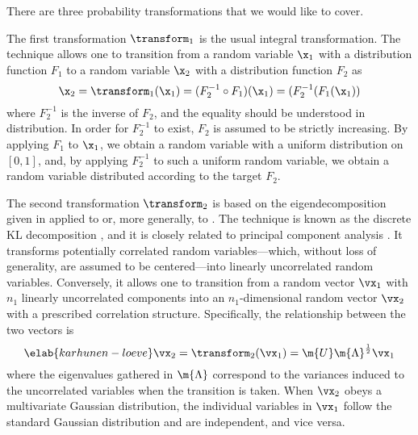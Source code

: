 There are three probability transformations that we would like to cover.

The first transformation $\transform_1$ is the usual integral transformation.
The technique allows one to transition from a random variable $\x_1$ with a
distribution function $F_1$ to a random variable $\x_2$ with a distribution
function $F_2$ as
\[
  \x_2 = \transform_1(\x_1) = (F_2^{-1} \circ F_1)(\x_1) = (F_2^{-1}(F_1(\x_1))
\]
where $F_2^{-1}$ is the inverse of $F_2$, and the equality should be understood
in distribution. In order for $F_2^{-1}$ to exist, $F_2$ is assumed to be
strictly increasing. By applying $F_1$ to $\x_1$, we obtain a random variable
with a uniform distribution on $[0, 1]$, and, by applying $F_2^{-1}$ to such a
uniform random variable, we obtain a random variable distributed according to
the target $F_2$.

The second transformation $\transform_2$ is based on the eigendecomposition
given in  applied to  or, more
generally, to . The technique is known as the discrete
\ac{KL} decomposition \cite{ghanem1991, xiu2010}, and it is closely related to
principal component analysis \cite{hastie2013}. It transforms potentially
correlated random variables---which, without loss of generality, are assumed to
be centered---into linearly uncorrelated random variables. Conversely, it allows
one to transition from a random vector $\vx_1$ with $n_1$ linearly uncorrelated
components into an $n_1$-dimensional random vector $\vx_2$ with a prescribed
correlation structure. Specifically, the relationship between the two vectors is
\begin{equation} \elab{karhunen-loeve}
  \vx_2 = \transform_2(\vx_1) = \m{U} \m{\Lambda}^\frac{1}{2} \vx_1
\end{equation}
where the eigenvalues gathered in $\m{\Lambda}$ correspond to the variances
induced to the uncorrelated variables when the transition is taken. When $\vx_2$
obeys a multivariate Gaussian distribution, the individual variables in $\vx_1$
follow the standard Gaussian distribution and are independent, and vice versa.

